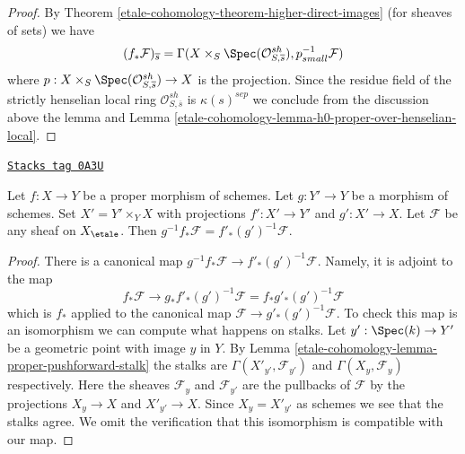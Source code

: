 \begin{proof}
By Theorem \ref{etale-cohomology-theorem-higher-direct-images} (for sheaves of sets)
we have
$$
(f_*\mathcal{F})_{\overline{s}} =
\Gamma(X \times_S \Spec(\mathcal{O}_{S, \overline{s}}^{sh}),
p_{small}^{-1}\mathcal{F})
$$
where $p : X \times_S \Spec(\mathcal{O}_{S, \overline{s}}^{sh}) \to X$
is the projection. Since the residue field of the strictly henselian
local ring $\mathcal{O}_{S, \overline{s}}^{sh}$ is $\kappa(s)^{sep}$
we conclude from the discussion above the lemma and
Lemma \ref{etale-cohomology-lemma-h0-proper-over-henselian-local}.
\end{proof}

\begin{lemma}
\label{etale-cohomology-lemma-proper-base-change-f-star}
\href{https://stacks.math.columbia.edu/tag/0A3U}{\texttt{Stacks tag 0A3U}}

Let $f : X \to Y$ be a proper morphism of schemes. Let $g : Y' \to Y$
be a morphism of schemes. Set $X' = Y' \times_Y X$ with projections
$f' : X' \to Y'$ and $g' : X' \to X$. Let $\mathcal{F}$ be any sheaf on
$X_\etale$. Then $g^{-1}f_*\mathcal{F} = f'_*(g')^{-1}\mathcal{F}$.
\end{lemma}

\begin{proof}
There is a canonical map $g^{-1}f_*\mathcal{F} \to f'_*(g')^{-1}\mathcal{F}$.
Namely, it is adjoint to the map
$$
f_*\mathcal{F} \longrightarrow
g_*f'_*(g')^{-1}\mathcal{F} = f_*g'_*(g')^{-1}\mathcal{F}
$$
which is $f_*$ applied to the canonical map
$\mathcal{F} \to g'_*(g')^{-1}\mathcal{F}$. To check this map is an
isomorphism we can compute what happens on stalks.
Let $y' : \Spec(k) \to Y'$ be a geometric point with image $y$ in $Y$.
By Lemma \ref{etale-cohomology-lemma-proper-pushforward-stalk} the stalks are
$\Gamma(X'_{y'}, \mathcal{F}_{y'})$ and $\Gamma(X_y, \mathcal{F}_y)$
respectively. Here the sheaves $\mathcal{F}_y$ and $\mathcal{F}_{y'}$
are the pullbacks of $\mathcal{F}$ by the projections $X_y \to X$
and $X'_{y'} \to X$. Since $X_y = X'_{y'}$ as schemes
we see that the stalks agree. We omit the
verification that this isomorphism is compatible with our map.
\end{proof}

